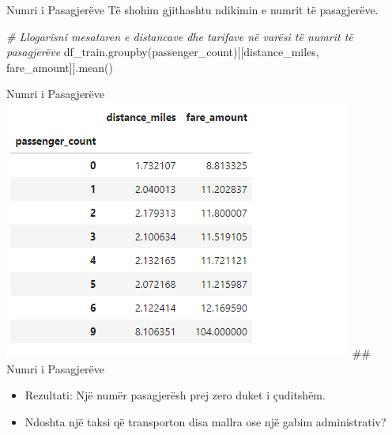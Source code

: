 \documentclass[
  ignorenonframetext,
]{beamer}
\newenvironment{Shaded}{\begin{snugshade}}{\end{snugshade}}
\newcommand{\CommentTok}[1]{\textcolor[rgb]{0.56,0.35,0.01}{\textit{#1}}}
\newcommand{\NormalTok}[1]{#1}
\newcommand{\StringTok}[1]{\textcolor[rgb]{0.31,0.60,0.02}{#1}}
\begin{document}
\begin{frame}[fragile]{Numri i Pasagjerëve}
\protect\hypertarget{numri-i-pasagjeruxebve}{}
Të shohim gjithashtu ndikimin e numrit të pasagjerëve.


\begin{Shaded}
\begin{Highlighting}[]
\CommentTok{\# Llogarisni mesataren e distancave dhe tarifave në varësi të numrit të pasagjerëve}
\NormalTok{df\_train.groupby(}\StringTok{\textquotesingle{}passenger\_count\textquotesingle{}}\NormalTok{)[[}\StringTok{\textquotesingle{}distance\_miles\textquotesingle{}}\NormalTok{, }\StringTok{\textquotesingle{}fare\_amount\textquotesingle{}}\NormalTok{]].mean()}
\end{Highlighting}
\end{Shaded}
\end{frame}

\begin{frame}{Numri i Pasagjerëve}
\protect\hypertarget{numri-i-pasagjeruxebve-1}{}
\includegraphics{./Figs/train22.png} \#\# Numri i Pasagjerëve

\begin{itemize}
\item
  Rezultati: Një numër pasagjerësh prej zero duket i çuditshëm.
\item
  Ndoshta një taksi që transporton disa mallra ose një gabim
  administrativ?
\end{itemize}
\end{frame}
\end{document}

